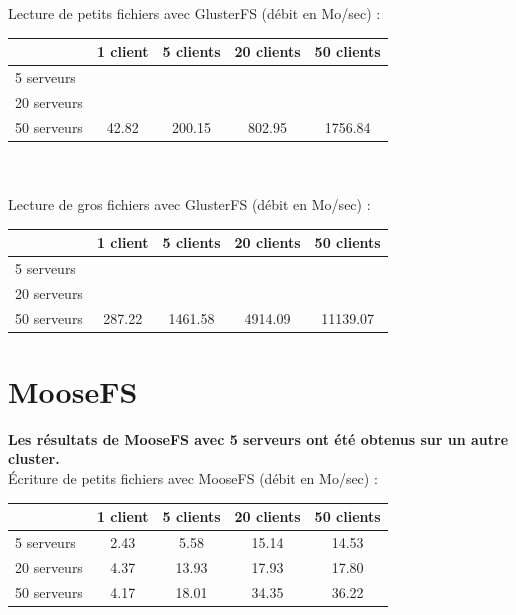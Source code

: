 \documentclass[12pt]{report}
\begin{document}
			Lecture de petits fichiers avec GlusterFS (débit en Mo/sec) :

			\begin{tabular}{|l|c|c|c|c|}
				\hline
				& 1 client & 5 clients & 20 clients & 50 clients \\
				\hline
				5 serveurs & & & & \\
				\hline
				20 serveurs & & & & \\
				\hline
				50 serveurs & 42.82 & 200.15 & 802.95 & 1756.84 \\
				\hline
			\end{tabular}\\\\

			Lecture de gros fichiers avec GlusterFS (débit en Mo/sec) :

			\begin{tabular}{|l|c|c|c|c|}
				\hline
				& 1 client & 5 clients & 20 clients & 50 clients \\
				\hline
				5 serveurs & & & & \\
				\hline
				20 serveurs & & & & \\
				\hline
				50 serveurs & 287.22 & 1461.58 & 4914.09 & 11139.07 \\
				\hline
			\end{tabular}

			\newpage

			\section{MooseFS}

			\textbf{Les résultats de MooseFS avec 5 serveurs ont été obtenus sur un autre cluster.}\\

			Écriture de petits fichiers avec MooseFS (débit en Mo/sec) :

			\begin{tabular}{|l|c|c|c|c|}
				\hline
				& 1 client & 5 clients & 20 clients & 50 clients \\
				\hline
				5 serveurs & 2.43 & 5.58 & 15.14 & 14.53 \\
				\hline
				20 serveurs & 4.37 & 13.93 & 17.93 & 17.80 \\
				\hline
				50 serveurs & 4.17 & 18.01 & 34.35 & 36.22 \\
				\hline
			\end{tabular}\\\\
\end{document}
